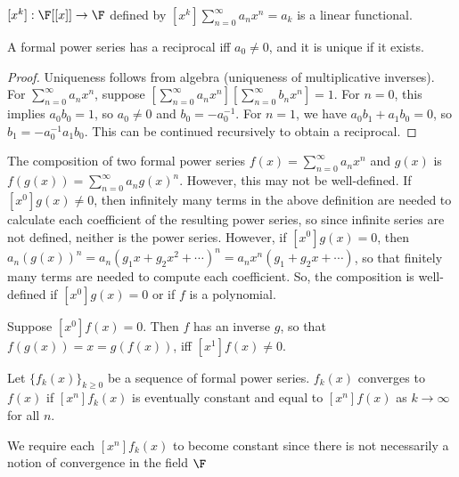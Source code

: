 \documentclass[a4paper]{article}
\begin{document}
\begin{definition}
$[x^k]:\F[[x]]\rightarrow\F$ defined by $[x^k]\sum_{n=0}^\infty a_nx^n=a_k$ is a linear functional.
\end{definition}

\begin{theorem}
A formal power series has a reciprocal iff $a_0\neq0$, and it is unique if it exists.

\begin{hl}
\begin{proof}
Uniqueness follows from algebra (uniqueness of multiplicative inverses). For $\sum_{n=0}^\infty a_nx^n$, suppose $\left[\sum_{n=0}^\infty a_nx^n\right]\left[\sum_{n=0}^\infty b_nx^n\right]=1$. For $n=0$, this implies $a_0b_0=1$, so $a_0\neq0$ and $b_0=-a_0^{-1}$. For $n=1$, we have $a_0b_1+a_1b_0=0$, so $b_1=-a_0^{-1}a_1b_0$. This can be continued recursively to obtain a reciprocal.
\end{proof}
\end{hl}
\end{theorem}

\begin{definition}
The composition of two formal power series $f(x)=\sum_{n=0}^\infty a_nx^n$ and $g(x)$ is $f(g(x))=\sum_{n=0}^\infty a_n g(x)^n$. However, this may not be well-defined. If $[x^0]g(x)\neq0$, then infinitely many terms in the above definition are needed to calculate each coefficient of the resulting power series, so since infinite series are not defined, neither is the power series. However, if $[x^0]g(x)=0$, then $a_n(g(x))^n=a_n(g_1x+g_2x^2+\cdots)^n=a_nx^n(g_1+g_2x+\cdots)$, so that finitely many terms are needed to compute each coefficient. So, the composition is well-defined if $[x^0]g(x)=0$ or if $f$ is a polynomial.
\end{definition}

\begin{proposition}
Suppose $[x^0]f(x)=0$. Then $f$ has an inverse $g$, so that $f(g(x))=x=g(f(x))$, iff $[x^1]f(x)\neq0$.
\end{proposition}

\begin{definition}
Let $\{f_k(x)\}_{k\geq0}$ be a sequence of formal power series. $f_k(x)$ converges to $f(x)$ if $[x^n]f_k(x)$ is eventually constant and equal to $[x^n]f(x)$ as $k\rightarrow\infty$ for all $n$.
\begin{arrows}
\item We require each $[x^n]f_k(x)$ to become constant since there is not necessarily a notion of convergence in the field $\F$
\end{arrows}
\end{definition}
\end{document}
